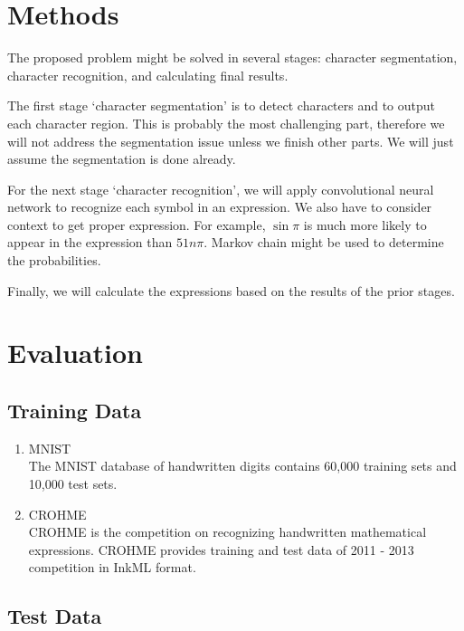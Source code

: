 \documentclass[10pt,twocolumn,letterpaper]{article}
\begin{document}
\section{Methods}

The proposed problem might be solved in several stages:
character segmentation, character recognition, and calculating final results.

The first stage `character segmentation' is to detect characters and to output each character region.
This is probably the most challenging part, therefore we will not address the segmentation issue
unless we finish other parts.
We will just assume the segmentation is done already.

For the next stage `character recognition',
we will apply convolutional neural network to recognize each symbol in an expression.
We also have to consider context to get proper expression. For example, $\sin \pi$ is much more likely to appear in the expression than $51n \pi$. Markov chain might be used to determine the probabilities.

Finally, we will calculate the expressions based on the results of the prior stages.


\section{Evaluation}


\subsection{Training Data}

\begin{enumerate}
\item MNIST \cite{MNIST} \\
The MNIST database of handwritten digits contains 60,000 training sets and 10,000 test sets.

\item CROHME \cite{CROHME} \\
CROHME is the competition on recognizing handwritten mathematical expressions. CROHME provides training and test data of 2011 - 2013 competition in InkML format.

\end{enumerate}

\subsection{Test Data}
\end{document}
